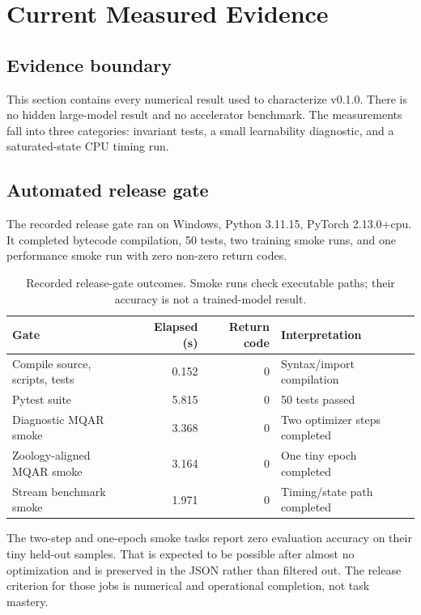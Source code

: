 \section{Current Measured Evidence}
\label{sec:results}

\subsection{Evidence boundary}

This section contains every numerical result used to characterize v0.1.0.
There is no hidden large-model result and no accelerator benchmark. The
measurements fall into three categories: invariant tests, a small learnability
diagnostic, and a saturated-state CPU timing run.

\subsection{Automated release gate}

The recorded release gate ran on Windows, Python 3.11.15, PyTorch
2.13.0+cpu. It completed bytecode compilation, 50 tests, two training smoke
runs, and one performance smoke run with zero non-zero return codes.

\begin{table}[h]
\centering
\caption{Recorded release-gate outcomes. Smoke runs check executable paths;
their accuracy is not a trained-model result.}
\label{tab:release-gate}
\begin{tabular}{@{}lrrl@{}}
\toprule
Gate & Elapsed (s) & Return code & Interpretation \\
\midrule
Compile source, scripts, tests & 0.152 & 0 & Syntax/import compilation \\
Pytest suite & 5.815 & 0 & 50 tests passed \\
Diagnostic MQAR smoke & 3.368 & 0 & Two optimizer steps completed \\
Zoology-aligned MQAR smoke & 3.164 & 0 & One tiny epoch completed \\
Stream benchmark smoke & 1.971 & 0 & Timing/state path completed \\
\bottomrule
\end{tabular}
\end{table}

The two-step and one-epoch smoke tasks report zero evaluation accuracy on
their tiny held-out samples. That is expected to be possible after almost no
optimization and is preserved in the JSON rather than filtered out. The
release criterion for those jobs is numerical and operational completion, not
task mastery.

